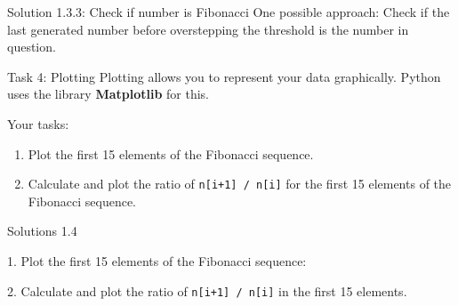 \begin{frame}[fragile]{Solution 1.3.3: Check if number is Fibonacci}
One possible approach: Check if the last generated number before overstepping the threshold is the number in question.
\footnotesize
   
\end{frame}

\begin{frame}{Task 4: Plotting}
Plotting allows you to represent your data graphically. Python uses the library \textbf{Matplotlib} for this.

Your tasks: 
 \begin{enumerate}
     \item Plot the first 15 elements of the Fibonacci sequence.
     \item Calculate and plot the ratio of \lstinline{n[i+1] / n[i]} for the first 15 elements of the Fibonacci sequence.  
 \end{enumerate}
\end{frame}

\begin{frame}[fragile]{Solutions 1.4}

\small
1. Plot the first 15 elements of the Fibonacci sequence:

\vfill
2. Calculate and plot the ratio of \lstinline{n[i+1] / n[i]} in the first 15 elements. 

\vfill
\end{frame}